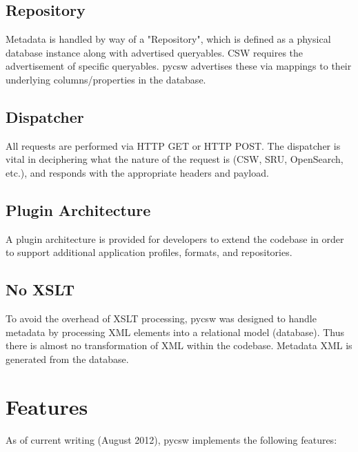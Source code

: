\subsection{Repository}
Metadata is handled by way of a "Repository", which is defined as a physical database instance along with advertised queryables.  CSW requires the advertisement of specific queryables.  pycsw advertises these via mappings to their underlying columns/properties in the database.

\subsection{Dispatcher}
All requests are performed via HTTP GET or HTTP POST.  The dispatcher is vital in deciphering what the nature of the request is (CSW, SRU, OpenSearch, etc.), and responds with the appropriate headers and payload.

\subsection{Plugin Architecture}
A plugin architecture is provided for developers to extend the codebase in order to support additional application profiles, formats, and repositories.

\subsection{No XSLT}
To avoid the overhead of XSLT processing, pycsw was designed to handle metadata by processing XML elements into a relational model (database).  Thus there is almost no transformation of XML within the codebase.  Metadata XML is generated from the database.

\section{Features}
\label{sec:features}

As of current writing (August 2012), pycsw implements the following features:

